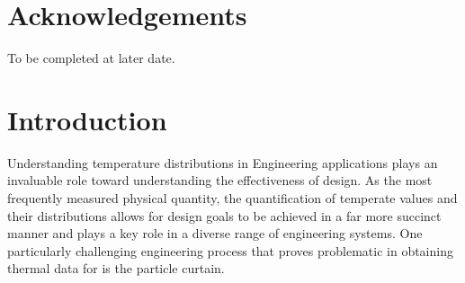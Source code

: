 \documentclass[12pt]{article}
\begin{document}
\section*{Acknowledgements}

{\color{red} To be completed at later date.} 


\pagebreak
\tableofcontents

\pagebreak
\listoffigures


\pagebreak

\pagebreak





\section{Introduction}

Understanding temperature distributions in Engineering applications plays an invaluable role toward understanding the effectiveness of design. 
As the most frequently measured physical quantity, the quantification of temperate values and their distributions allows for design goals to be achieved in a far more succinct manner and plays a key role in a diverse range of engineering systems. One particularly challenging engineering process that proves problematic in obtaining thermal data for is the particle curtain. \\
\end{document}
